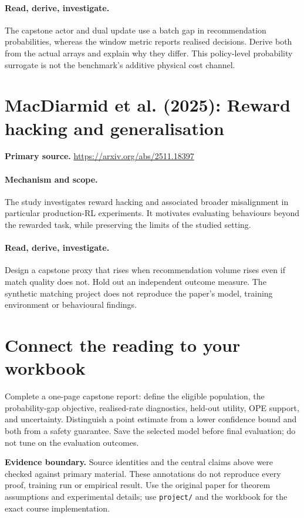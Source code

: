 \documentclass[11pt]{scrartcl}
\begin{document}
\paragraph{Read, derive, investigate.} The capstone actor and dual update use a batch gap in recommendation probabilities, whereas the window metric reports realised decisions. Derive both from the actual arrays and explain why they differ. This policy-level probability surrogate is not the benchmark's additive physical cost channel.

\section{MacDiarmid et al. (2025): Reward hacking and generalisation}
\noindent\textbf{Primary source.} \url{https://arxiv.org/abs/2511.18397}

\paragraph{Mechanism and scope.} The study investigates reward hacking and associated broader misalignment in particular production-RL experiments. It motivates evaluating behaviours beyond the rewarded task, while preserving the limits of the studied setting.

\paragraph{Read, derive, investigate.} Design a capstone proxy that rises when recommendation volume rises even if match quality does not. Hold out an independent outcome measure. The synthetic matching project does not reproduce the paper's model, training environment or behavioural findings.

\section*{Connect the reading to your workbook}
Complete a one-page capstone report: define the eligible population, the probability-gap objective, realised-rate diagnostics, held-out utility, OPE support, and uncertainty. Distinguish a point estimate from a lower confidence bound and both from a safety guarantee. Save the selected model before final evaluation; do not tune on the evaluation outcomes.

\noindent\textbf{Evidence boundary.} Source identities and the central claims above were checked against primary material. These annotations do not reproduce every proof, training run or empirical result. Use the original paper for theorem assumptions and experimental details; use \texttt{project/} and the workbook for the exact course implementation.
\end{document}
